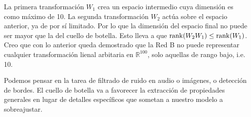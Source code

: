La primera transformación $W_1$ crea un espacio intermedio cuya dimensión es como máximo de 10. La segunda
transformación $W_2$ actúa sobre el espacio anterior, ya de por sí limitado. Por lo que la dimensión
del espacio final no puede ser mayor que la del cuello de botella. Esto lleva a que $\rank(W_2 W_1) \le \rank(W_1)$. 
Creo que con lo anterior queda demostrado que la Red B no puede representar cualquier transformación lienal 
arbitaria en $\mathbb{R}^{100}$, solo aquellas de rango bajo, i.e. 10. 

Podemos pensar en la tarea de filtrado de ruido en audio o imágenes, o detección de bordes. El cuello de botella
va a favorecer la extracción de propiedades generales en lugar de detalles específicos que sometan a nuestro
modelo a sobreajustar. 

\clearpage










